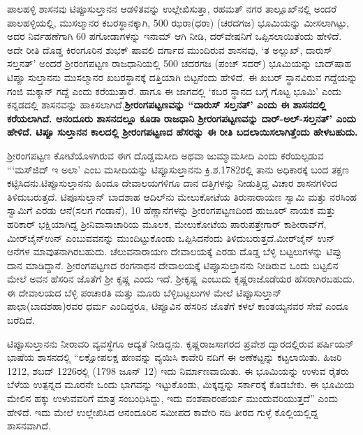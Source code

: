 ಪಾಲಹಳ್ಳಿ ಶಾಸನವು ಟಿಪ್ಪೂಸುಲ್ತಾನನ ಆಡಳಿತವನ್ನು ಉಲ್ಲೇಖಿಸುತ್ತಾ, ರಹಮತ್ ನಗರ ತಾಲ್ಲೂಖ್‌ನಲ್ಲಿ ಅಂದರೆ ಪಾಲಹಳ್ಳಿಯಲ್ಲಿ, ಮುಸಲ್ಮಾನರ ಕಬರಸ್ಥಾನಕ್ಕಾಗಿ, 500 ಝರಾ(ಧರಾ) (ಚರದಗಜ) ಭೂಮಿಯನ್ನು ಮೀಸಲಾಗಿಟ್ಟು, ಅದರ ನಿರ್ವಹಣೆಗಾಗಿ 60 ಪಗೋಡಾಗಳನ್ನು ಇನಾಮ್ ಆಗಿ ನೀಡಿ, ದರ್​ವೇಷನಿಗೆ ಒಪ್ಪಿಸಲಾಯಿತೆಂದು ಹೇಳಿದೆ. ಅದೇ ರೀತಿ ದೊಡ್ಡ ಕಿರಂಗೂರಿನ ಶುಭಕ್ ಷಾವಲಿ ದರ್ಗಾದ ಮುಂದಿರುವ ಶಾಸನವು, `ತ ಅಲ್ಲುಖ್, ದಾರುಸ್ ಸಲ್ತನತ್' ಅಂದರೆ ಶ‍್ರೀರಂಗಪಟ್ಟಣ ರಾಜಧಾನಿಯಲ್ಲಿ 500 ಚದರಗಜ (ಪಂಚ್ ಸದರ್) ಭೂಮಿಯನ್ನು ಬಾದ್‌ಷಾಹ ಟಿಪ್ಪೂ ಸುಲ್ತಾನನು ಮುಸಲ್ಮಾನರ ಖಬರಸ್ಥಾನಕ್ಕೆ ದತ್ತಿಯಾಗಿ ಬಿಟ್ಟನೆಂದು ಹೇಳಿದೆ. ಈ ಖಬರ್ ಸ್ಥಾನವಿರುವ ಗದ್ದೆಯನ್ನು ಗಂಜಿ ಮಕ್ಕಾನ್ ಗದ್ದೆ ಎಂದು ಕರೆಯುತ್ತಾರೆ. ಹಾಗೂ ಈ ಜಾಗದಲ್ಲಿ `ಕಬರ ಸ್ಥಾನದ ಬಗ್ಗೆ ಗೊಟ್ಟ ಭೂಮಿ' ಎಂದು ಕನ್ನಡದಲ್ಲಿ ಶಾಸನವನ್ನು ಹಾಕಿಸಲಾಗಿದೆ.\textbf{ಶ‍್ರೀರಂಗಪಟ್ಟಣವನ್ನು ``ದಾರುಸ್ ಸಲ್ತನತ್' ಎಂದು ಈ ಶಾಸನದಲ್ಲಿ ಕರೆಯಲಾಗಿದೆ. ಆನಂದೂರು ಶಾಸನದಲ್ಲೂ ಕೂಡಾ ರಾಜಧಾನಿ ಶ‍್ರೀರಂಗಪಟ್ಟಣವನ್ನು ದಾರ್-ಅಲ್-ಸಲ್ತನತ್' ಎಂದು ಹೇಳಿದೆ. ಟಿಪ್ಪೂ ಸುಲ್ತಾನನ ಕಾಲದಲ್ಲಿ ಶ‍್ರೀರಂಗಪಟ್ಟಣದ ಹೆಸರನ್ನು ಈ ರೀತಿ ಬದಲಾಯಿಸಲಾಗಿತ್ತೆಂದು ಹೇಳಬಹುದು.}

ಶ‍್ರೀರಂಗಪಟ್ಟಣ ಕೋಟೆಯೊಳಗಿರುವ ಈಗ ದೊಡ್ಡಮಸೀದಿ ಅಥವಾ ಜುಮ್ಮಾಮಸೀದಿ ಎಂದು ಕರೆಯಲ್ಪಡುವ ```ಮಸ್‌ಜಿದ್ ಇ ಅಲಾ' ಎಂಬ ಮಸೀದಿಯನ್ನು ಟಿಪ್ಪೂಸುಲ್ತಾನನು ಕ್ರಿ.ಶ.1782ರಲ್ಲಿ ತಾನು ಅಧಿಕಾರಕ್ಕೆ ಬಂದ ತಕ್ಷಣ ಕಟ್ಟಿಸಿದನು.ಟಿಪ್ಪೂಸುಲ್ತಾನನು ಹಿಂದೂ ದೇವಾಲಯಗಳಿಗೂ ದಾನ ದತ್ತಿಗಳನ್ನು ನೀಡುತ್ತಿದ್ದ ವಿಚಾರ ಶಾಸನಗಳಿಂದ ತಿಳಿದುಬರುತ್ತದೆ. ಟಿಪೂಸುಲ್ತಾನ್ ಬಾದಶಾಹ ಆದಿಲ್‌ನು ಮೇಲುಕೋಟೆಯ ತಿರುನಾರಾಯಣ ಸ್ವಾಮಿ ಮತ್ತು ನರಸಿಂಹ ಸ್ವಾಮಿಗೆ ಎರಡು ಆನೆ(ಸಲಗ ಗಂಡಾನೆ), 10 ಹೆಣ್ಣಾನೆಗಳನ್ನು ಶ‍್ರೀರಂಗಪಟ್ಟಣದಿಂದ ಹುಜೂರ್ ನಾಯಕ ಮತ್ತು ಹರಿಕಾರ್ ಭಕ್ಷಿಯಾಗಿದ್ದ ಶ‍್ರೀನಿವಾಸಾಚಾರಿಯ ಮೂಲಕ, ಮೇಲುಕೋಟೆಯ ಪಾರುಪತ್ತೇಗಾರ್ ಕಾಶೀರಾವ್‌ಗೆ, ಮೀರ್‌ಜೈನ್‌ಉನ್ ಎಂಬುವವನನ್ನು ಮುಂದಿಟ್ಟುಕೊಂಡು ಒಪ್ಪಿಸಿದನೆಂದು ತಿಳಿದುಬರುತ್ತದೆ.ಮೀರ್‌ಜೈನ್ ಉನ್ ಆನೆಗಳ ಮಾವುತ\-ನಾಗಿರಬಹುದು. ಚೆಲುವನಾರಾಯಣ ದೇವಾಲಯಕ್ಕೆ ಎರಡು ದೊಡ್ಡ ಬೆಳ್ಳಿ ಬಟ್ಟಲುಗಳನ್ನು ಟಿಪ್ಪು ದಾನ ಮಾಡಿದ್ದಾನೆ. ಶ‍್ರೀರಂಗಪಟ್ಟಣದ ರಂಗನಾಥನ ದೇವಾಲಯಕ್ಕೆ ಟಿಪ್ಪೂಸುಲ್ತಾನನು ನೀಡಿರುವ ಒಂದು ಬಟ್ಟಲಿನ ಮೇಲೆ ಅವನ ಹೆಸರಿನ ಜೊತೆಗೆ ಶ‍್ರೀ ಕೃಷ್ಣ ಎಂದು ಇದೆ. ಶ‍್ರೀಕೃಷ್ಣ ಎಂಬುದು ಕೃಷ್ಣರಾಜೊಡೆಯರ ಹೆಸರಾಗಿರಬಹುದು. ಈ ದೇವಾಲಯದ ಬೆಳ್ಳಿ ಪಂಚಾರತಿ ಮತ್ತು ಮೂರು ಬೆಳ್ಳಿಬಟ್ಟಲುಗಳ ಮೇಲೆ ಟಿಪ್ಪೂಸುಲ್ತಾನ್​ ಪಾಛಾ(ಬಾದಶಹಾ)ರವರ ಧರ್ಮ ಎಂದಿದ್ದರೂ, ಟಿಪ್ಪೂವಿನ ಹೆಸರಿನ ಜೊತೆಗೆ ಕಳಲೆ ಕಾಂತಯ್ಯನವರ ಸೇವೆ ಎಂದೂ ಬರೆದಿದೆ.

ಟಿಪ್ಪೂಸುಲ್ತಾನನು ನೀರಾವರಿ ವ್ಯವಸ್ಥೆಗೂ ಆದ್ಯತೆ ನೀಡಿದ್ದನು. ಕೃಷ್ಣರಾಜಸಾಗರದ ಪ್ರವೇಶ ದ್ವಾರದಲ್ಲಿರುವ ಪರ್ಷಿಯನ್​ ಭಾಷೆಯ ಶಾಸನದಲ್ಲಿ “ಲಕ್ಷೋಪಲಕ್ಷ ಹಣವನ್ನು ವ್ಯಯಿಸಿ ಕಾವೇರಿ ನದಿಗೆ ಈ ಅಣೆಕಟ್ಟನ್ನು ಕಟ್ಟಲಾಯಿತು. ಹಿಜರಿ 1212, ಶಬದ್​ 1226ರಲ್ಲಿ (1798 ಜೂನ್​ 12) ಇದು ನಿರ್ಮಾಣವಾಯಿತು. ಈ ಭೂಮಿಯನ್ನು ಉಳುವ ರೈತರು ಬೆಳೆಯ ಉತ್ಪನ್ನದ ಮೂರನೇ ಒಂದು ಭಾಗವನ್ನು ಇಟ್ಟುಕೊಂಡು, ಮಿಕ್ಕದ್ದನ್ನು ಸರ್ಕಾರಕ್ಕೆ ಕೊಡಬೇಕು. ಈ ಭೂಮಿಯ ಮೇಲಿನ ಹಕ್ಕು ಉಳುವವರಿಗೆ ಮಾತ್ರ ಸಂಬಂಧಿಸಿದ್ದು, ಇದು ವಂಶಪಾರಂಪರ್ಯ ಮುಂದುವರಿಯುತ್ತದೆ” ಎಂದು ಹೇಳಿದೆ. ಇದು ಮೇಲೆ ಉಲ್ಲೇಖಿಸಿದ ಆನಂದೂರಿನ ಸಮೀಪದ ಕಾವೇರಿ ನದಿ ತೀರದ ಗುಳ್ಳೆ ಕೊಲ್ಲಿಯಲ್ಲಿದ್ದ ಶಾಸನವಾಗಿದೆ.

